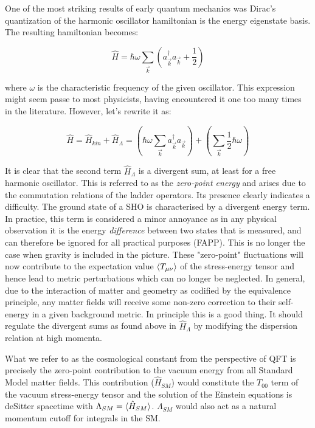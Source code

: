\begin{doublespace}
One of the most striking results of early quantum mechanics was Dirac's quantization of the harmonic oscillator hamiltonian is the energy eigenstate basis. The resulting hamiltonian becomes:

\begin{equation}
\hat{H} =  \hbar \omega \sum_{\vec{k}} \left( a^\dagger_{\vec{k}} a_{\vec{k}}  + \frac{1}{2} \right)
\end{equation}

where $\omega$ is the characteristic frequency of the given oscillator. This expression might seem passe to most physicists, having encountered it one too many times in the literature. However, let's rewrite it as:

\begin{equation}
\hat{H} = \hat{H}_{kin} + \hat{H}_{\Lambda} = \left( \hbar \omega \sum_{\vec{k}} a^\dagger_{\vec{k}} a_{\vec{k}} \right) + \left( \sum_{\vec{k}} \frac{1}{2} \hbar \omega \right)
\end{equation}

It is clear that the second term $\hat{H}_\Lambda $ is a divergent sum, at least for a free harmonic oscillator. This is referred to as the \emph{zero-point energy} and arises due to the commutation relations of the ladder operators. Its presence clearly indicates a difficulty. The ground state of a SHO is characterised by a divergent energy term. In practice, this term is considered a minor annoyance as in any physical observation it is the energy \emph{difference} between two states that is measured, and can therefore be ignored for all practical purposes (FAPP). This is no longer the case when gravity is included in the picture. These "zero-point" fluctuations will now contribute to the expectation value $\langle T_{\mu\nu}\rangle$ of the stress-energy tensor and hence lead to metric perturbations which can no longer be neglected. In general, due to the interaction of matter and geometry as codified by the equivalence principle, any matter fields will receive some non-zero correction to their self-energy in a given background metric. In principle this is a good thing. It should regulate the divergent sums as found above in $\hat H_\Lambda$ by modifying the dispersion relation at high momenta.

What we refer to as the cosmological constant from the perspective of QFT is precisely the zero-point contribution to the vacuum energy from all Standard Model matter fields. This contribution ($\hat H_{SM}$) would constitute the $T_{00}$ term of the vacuum stress-energy tensor and the solution of the Einstein equations is deSitter spacetime with $\Lambda_{SM} = \langle \hat H_{SM}\rangle$. $\Lambda_{SM}$ would also act as a natural momentum cutoff for integrals in the SM.


\end{doublespace}

